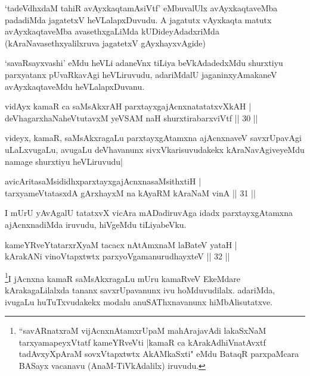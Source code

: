 \begin{artha}
`tadeVdhxdaM tahiR avAyxkaqtamAsiVtf' eMbuvalUlx avAyxkaqtaveMba padadiMda jagatetxV heVLalapxDuvudu. A jagatutx vAyxkaqta matutx avAyxkaqtaveMba avasethxgaLiMda kUDideyAdadxriMda (kAraNavasethxyalilxruva jagatetxV gAyxhayxvAgide)

`savaRsayxvashi' eMdu heVLi adaneVnx tiLiya beVkAdadedxMdu shurxtiyu parxyatanx pUvaRkavAgi heVLiruvudu, adariMdalU jaganinxyAmakaneV avAyxkaqtaveMdu heVLalapxDuvanu.
\end{artha}


\begin{shl}
vidAyx kamaR ca saMsAkxrAH parxtayxgajAcnxnatatatxvXkAH |\\
deVhagarxhaNaheVtutavxM yeVSAM naH shurxtirabarxviVtf \hfill || 30 ||
\end{shl}

\begin{artha}
videyx, kamaR, saMsAkxragaLu parxtayxgAtamxna ajAcnxnaveV savxrUpavAgi uLaLxvugaLu, avugaLu deVhavanunx sivxVkarisuvudakekx kAraNavAgiveyeMdu namage shurxtiyu heVLiruvudu|
\end{artha}

\begin{shl}
avicAritasaMsididhxparxtayxgajAcnxnasaMsithxtiH |\\
tarxyameVtatasxdA gArxhayxM na kAyaRM kAraNaM vinA \hfill || 31 ||
\end{shl}

\begin{artha}
I mUrU yAvAgalU tatatxvX vicAra mADadiruvAga idadx parxtayxgAtamxna ajAcnxnadiMda iruvudu, hiVgeMdu tiLiyabeVku. 
\end{artha}


\begin{shl}
kameYRveYtatarxrXyaM tacacx nA\s \s tAmxnaM laBateV yataH |\\
kArakANi vinoVtapxtwtx parxyoVgamanurudhayxteV \hfill || 32 ||
\end{shl}

\begin{artha}
\footnote{``savARnatxraM vijAcnxnAtamxrUpaM mahArajavAdi lakaSxNaM tarxyamapeyxVtatf kameYRveVti |\break kamaR ca kArakAdhiVnatAvxtf tadAvxyXpAraM sovxVtapxtwtx AkAMkaSxti" eMdu BataqR parxpaMcara BASayx vacanavu (AnaM-TiVkAdalilx) iruvudu.}I jAcnxna kamaR saMsAkxragaLu mUru kamaRveV EkeMdare kArakagaLilalxda tananx savxrUpavanunx ivu hoMduvudilalx. adariMda, ivugaLu huTuTxvudakekx modalu anuSAThxnavanunx hiMbAlisutatxve.
\end{artha}

